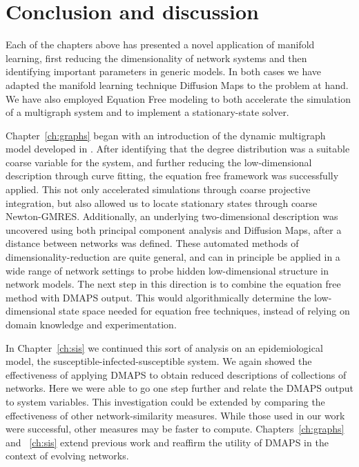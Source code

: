 \chapter{Conclusion and discussion \label{ch:conc}}

Each of the chapters above has presented a novel application of
manifold learning, first reducing the dimensionality of network
systems and then identifying important parameters in generic
models. In both cases we have adapted the manifold learning technique
Diffusion Maps to the problem at hand. We have also employed Equation
Free modeling to both accelerate the simulation of a multigraph system
and to implement a stationary-state solver.

Chapter~\ref{ch:graphs} began with an introduction of the dynamic
multigraph model developed in
\cite{rath_multigraph_2012,rath_time_2012}. After identifying that the
degree distribution was a suitable coarse variable for the system, and
further reducing the low-dimensional description through curve
fitting, the equation free framework was successfully applied. This
not only accelerated simulations through coarse projective
integration, but also allowed us to locate stationary states through
coarse Newton-GMRES. Additionally, an underlying two-dimensional
description was uncovered using both principal component analysis and
Diffusion Maps, after a distance between networks was defined. These
automated methods of dimensionality-reduction are quite general, and
can in principle be applied in a wide range of network settings to
probe hidden low-dimensional structure in network models. The next
step in this direction is to combine the equation free method with
DMAPS output. This would algorithmically determine the low-dimensional
state space needed for equation free techniques, instead of relying on
domain knowledge and experimentation.

In Chapter~\ref{ch:sis} we continued this sort of analysis on an
epidemiological model, the susceptible-infected-susceptible
system. We again showed the effectiveness of applying DMAPS to obtain
reduced descriptions of collections of networks. Here we were able to
go one step further and relate the DMAPS output to system
variables. This investigation could be extended by comparing the
effectiveness of other network-similarity measures. While those used
in our work were successful, other measures may be faster to
compute. Chapters~\ref{ch:graphs} and ~\ref{ch:sis} extend previous
work and reaffirm the utility of DMAPS in the context of evolving
networks.

